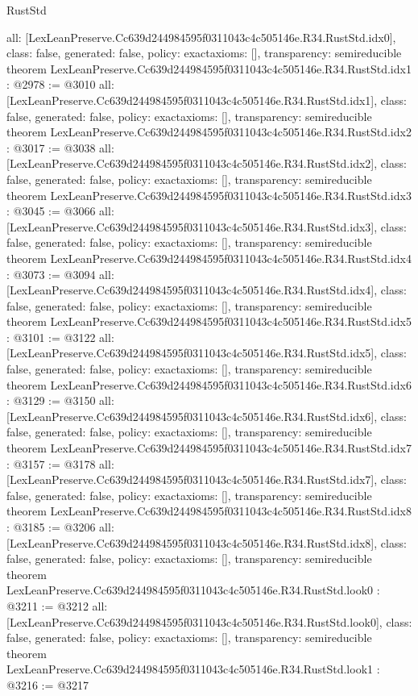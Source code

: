 \begin{lexlean}{RustStd}
\begin{coremodule}
{  all: [LexLeanPreserve.Cc639d244984595f0311043c4c505146e.R34.RustStd.idx0],
  class: false,
  generated: false,
  policy: exact{axioms: []},
  transparency: semireducible
}
theorem LexLeanPreserve.Cc639d244984595f0311043c4c505146e.R34.RustStd.idx1 : @2978 := @3010 {
  all: [LexLeanPreserve.Cc639d244984595f0311043c4c505146e.R34.RustStd.idx1],
  class: false,
  generated: false,
  policy: exact{axioms: []},
  transparency: semireducible
}
theorem LexLeanPreserve.Cc639d244984595f0311043c4c505146e.R34.RustStd.idx2 : @3017 := @3038 {
  all: [LexLeanPreserve.Cc639d244984595f0311043c4c505146e.R34.RustStd.idx2],
  class: false,
  generated: false,
  policy: exact{axioms: []},
  transparency: semireducible
}
theorem LexLeanPreserve.Cc639d244984595f0311043c4c505146e.R34.RustStd.idx3 : @3045 := @3066 {
  all: [LexLeanPreserve.Cc639d244984595f0311043c4c505146e.R34.RustStd.idx3],
  class: false,
  generated: false,
  policy: exact{axioms: []},
  transparency: semireducible
}
theorem LexLeanPreserve.Cc639d244984595f0311043c4c505146e.R34.RustStd.idx4 : @3073 := @3094 {
  all: [LexLeanPreserve.Cc639d244984595f0311043c4c505146e.R34.RustStd.idx4],
  class: false,
  generated: false,
  policy: exact{axioms: []},
  transparency: semireducible
}
theorem LexLeanPreserve.Cc639d244984595f0311043c4c505146e.R34.RustStd.idx5 : @3101 := @3122 {
  all: [LexLeanPreserve.Cc639d244984595f0311043c4c505146e.R34.RustStd.idx5],
  class: false,
  generated: false,
  policy: exact{axioms: []},
  transparency: semireducible
}
theorem LexLeanPreserve.Cc639d244984595f0311043c4c505146e.R34.RustStd.idx6 : @3129 := @3150 {
  all: [LexLeanPreserve.Cc639d244984595f0311043c4c505146e.R34.RustStd.idx6],
  class: false,
  generated: false,
  policy: exact{axioms: []},
  transparency: semireducible
}
theorem LexLeanPreserve.Cc639d244984595f0311043c4c505146e.R34.RustStd.idx7 : @3157 := @3178 {
  all: [LexLeanPreserve.Cc639d244984595f0311043c4c505146e.R34.RustStd.idx7],
  class: false,
  generated: false,
  policy: exact{axioms: []},
  transparency: semireducible
}
theorem LexLeanPreserve.Cc639d244984595f0311043c4c505146e.R34.RustStd.idx8 : @3185 := @3206 {
  all: [LexLeanPreserve.Cc639d244984595f0311043c4c505146e.R34.RustStd.idx8],
  class: false,
  generated: false,
  policy: exact{axioms: []},
  transparency: semireducible
}
theorem LexLeanPreserve.Cc639d244984595f0311043c4c505146e.R34.RustStd.look0 : @3211 := @3212 {
  all: [LexLeanPreserve.Cc639d244984595f0311043c4c505146e.R34.RustStd.look0],
  class: false,
  generated: false,
  policy: exact{axioms: []},
  transparency: semireducible
}
theorem LexLeanPreserve.Cc639d244984595f0311043c4c505146e.R34.RustStd.look1 : @3216 := @3217 {
}
\end{coremodule}
\end{lexlean}
